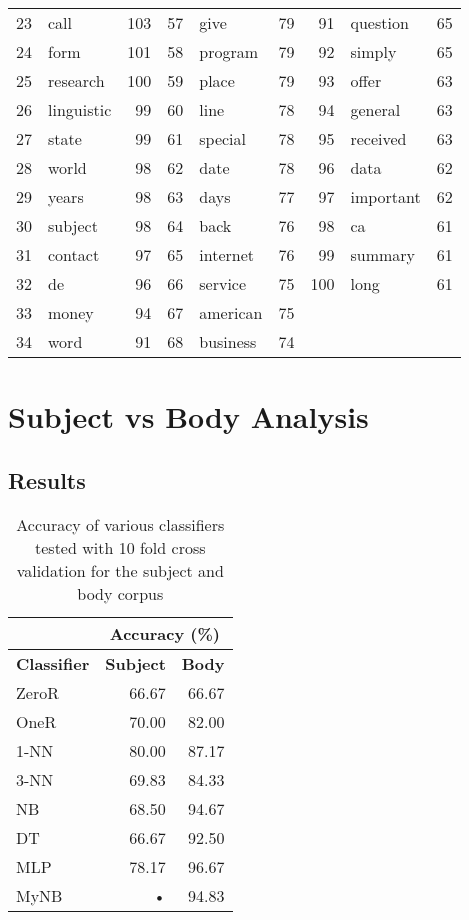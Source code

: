\documentclass[10pt, a4paper]{article}
\begin{document}
\begin{table}[H]
\begin{tabular}{@{}rlrrlrrlr@{}}
23 & call & 103 & 57 & give & 79 & 91 & question & 65 \\
24 & form & 101 & 58 & program & 79 & 92 & simply & 65 \\
25 & research & 100 & 59 & place & 79 & 93 & offer & 63 \\
26 & linguistic & 99 & 60 & line & 78 & 94 & general & 63 \\
27 & state & 99 & 61 & special & 78 & 95 & received & 63 \\
28 & world & 98 & 62 & date & 78 & 96 & data & 62 \\
29 & years & 98 & 63 & days & 77 & 97 & important & 62 \\
30 & subject & 98 & 64 & back & 76 & 98 & ca & 61 \\
31 & contact & 97 & 65 & internet & 76 & 99 & summary & 61 \\
32 & de & 96 & 66 & service & 75 & 100 & long & 61 \\
33 & money & 94 & 67 & american & 75 &  &  &  \\
34 & word & 91 & 68 & business & 74 &  &  &  \\
\bottomrule
\end{tabular}
\label{table:bodycorpus}
\end{table}

\section{Subject vs Body Analysis}

\subsection{Results}


\begin{table}[H]
\centering
\caption{Accuracy of various classifiers tested with 10 fold cross validation for the subject and body corpus}\vspace{1em}
\begin{tabular}{@{}lrr@{}}
\toprule
& \multicolumn{2}{c}{\textbf{Accuracy (\%)}} \\
\midrule
\textbf{Classifier} & \textbf{Subject} & \textbf{Body} \\
\midrule
ZeroR & 66.67 & 66.67 \\
OneR & 70.00 & 82.00 \\
1-NN & 80.00 & 87.17 \\
3-NN & 69.83 & 84.33 \\
NB & 68.50 & 94.67 \\
DT & 66.67 & 92.50 \\
MLP & 78.17 & 96.67 \\
MyNB & • & 94.83 \\
\bottomrule
\end{tabular}
\label{table:results}
\end{table}
\end{document}
